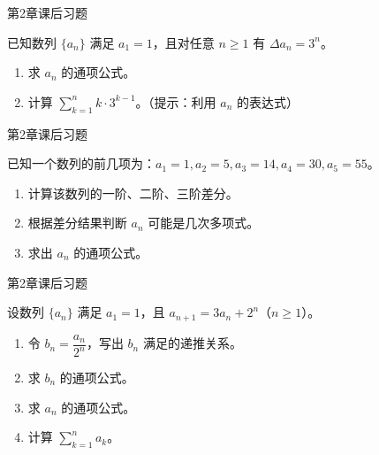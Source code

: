 \documentclass[aspectratio=169,10pt,fontset=fandol]{ctexbeamer}
\begin{document}
\begin{frame}[t,fragile]{第2章课后习题}
\normalsize
{\normalsize
已知数列 \(\{a_n\}\) 满足 \(a_1 = 1\)，且对任意 \(n \geq 1\) 有 \(\Delta a_n = 3^n\)。

\begin{enumerate}

\item 求 \(a_n\) 的通项公式。

\item 计算 \(\sum_{k=1}^{n} k \cdot 3^{k-1}\)。（提示：利用 \(a_n\) 的表达式）

\end{enumerate}


}
\end{frame}
\begin{frame}[t,fragile]{第2章课后习题}
\normalsize
{\normalsize
已知一个数列的前几项为：\(a_1 = 1, a_2 = 5, a_3 = 14, a_4 = 30, a_5 = 55\)。

\begin{enumerate}

\item 计算该数列的一阶、二阶、三阶差分。

\item 根据差分结果判断 \(a_n\) 可能是几次多项式。

\item 求出 \(a_n\) 的通项公式。

\end{enumerate}


}
\end{frame}
\begin{frame}[t,fragile]{第2章课后习题}
\normalsize
{\normalsize


设数列 \(\{a_n\}\) 满足 \(a_1 = 1\)，且 \(a_{n+1} = 3a_n + 2^n\)（\(n \geq 1\)）。

\begin{enumerate}

\item 令 \(b_n = \dfrac{a_n}{2^n}\)，写出 \(b_n\) 满足的递推关系。

\item 求 \(b_n\) 的通项公式。

\item 求 \(a_n\) 的通项公式。

\item 计算 \(\sum_{k=1}^{n} a_k\)。

\end{enumerate}


}
\end{frame}
\end{document}
